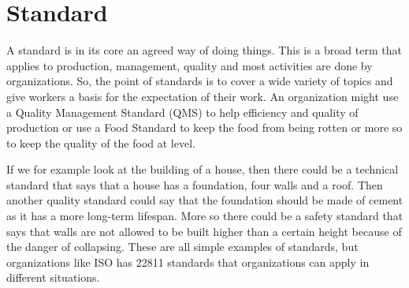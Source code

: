 \section{Standard}
A standard is in its core an agreed way of doing things. This is a broad term that applies to production, management, quality and most activities are done by organizations. So, the point of standards is to cover a wide variety of topics and give workers a basis for the expectation of their work. An organization might use a Quality Management Standard (QMS) to help efficiency and quality of production or use a Food Standard to keep the food from being rotten or more so to keep the quality of the food at level.

If we for example look at the building of a house, then there could be a technical standard that says that a house has a foundation, four walls and a roof. Then another quality standard could say that the foundation should be made of cement as it has a more long-term lifespan. More so there could be a safety standard that says that walls are not allowed to be built higher than a certain height because of the danger of collapsing. These are all simple examples of standards, but organizations like ISO has 22811 standards that organizations can apply in different situations.
